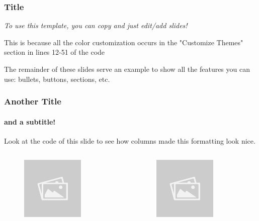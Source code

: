 \documentclass[
    11pt, %
    aspectratio=169, %
]{beamer}
\begin{document}
\begin{frame}
	\frametitle{Title}
            \emph{To use this template, you can copy and just edit/add slides!}\newline

            This is because all the color customization occurs in the "Customize Themes" section in lines 12-51 of the code\newline

            The remainder of these slides serve an example to show all the features you can use: bullets, buttons, sections, etc.
\end{frame}

\begin{frame}
	\frametitle{Another Title}
	\framesubtitle{and a subtitle!}

	Look at the code of this slide to see how columns made this formatting look nice.

	\begin{columns}[t] %
		\begin{column}{0.5\textwidth} %
                \begin{figure}[h!]
                    \centering
                    \includegraphics[angle=0, width=3cm]{Hokie2.png}
                \end{figure}
		\end{column}
  		\begin{column}{0.5\textwidth} %
                \begin{figure}[h!]
                    \centering
                    \includegraphics[angle=0, width=3cm]{Hokie2.png}
                \end{figure}
		\end{column}
	\end{columns}
\end{frame}
\end{document}
